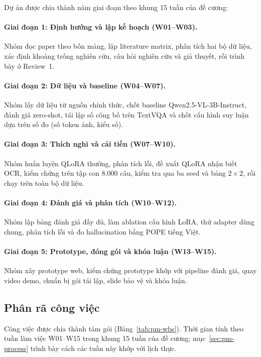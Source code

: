 Dự án được chia thành năm giai đoạn theo khung 15 tuần của đề cương:

\paragraph{Giai đoạn 1: Định hướng và lập kế hoạch (W01--W03).} Nhóm đọc paper
theo bốn mảng, lập literature matrix, phân tích hai bộ dữ liệu, xác định khoảng
trống nghiên cứu, câu hỏi nghiên cứu và giả thuyết, rồi trình bày ở Review~1.

\paragraph{Giai đoạn 2: Dữ liệu và baseline (W04--W07).} Nhóm lấy dữ liệu từ nguồn
chính thức, chốt baseline Qwen2.5-VL-3B-Instruct, đánh giá zero-shot, tái lập số công bố
trên TextVQA và chốt cấu hình suy luận dựa trên số đo (số token ảnh, kiểu số).

\paragraph{Giai đoạn 3: Thích nghi và cải tiến (W07--W10).} Nhóm huấn luyện QLoRA
thường, phân tích lỗi, đề xuất QLoRA nhận biết OCR, kiểm chứng trên tập con 8.000
câu, kiểm tra qua ba seed và bảng $2\times2$, rồi chạy trên toàn bộ dữ liệu.

\paragraph{Giai đoạn 4: Đánh giá và phân tích (W10--W12).} Nhóm lập bảng đánh giá
đầy đủ, làm ablation cấu hình LoRA, thử adapter dùng chung, phân tích lỗi và đo
hallucination bằng POPE tiếng Việt.

\paragraph{Giai đoạn 5: Prototype, đóng gói và khóa luận (W13--W15).} Nhóm xây
prototype web, kiểm chứng prototype khớp với pipeline đánh giá, quay video demo,
chuẩn bị gói tái lập, slide bảo vệ và khóa luận.

\subsection{Phân rã công việc}
\label{sec:pm-wbs}

Công việc được chia thành tám gói (Bảng~\ref{tab:pm-wbs}). Thời gian tính theo
tuần làm việc W01--W15 trong khung 15 tuần của đề cương;
mục~\ref{sec:pm-process} trình bày cách các tuần này khớp với lịch thực.

